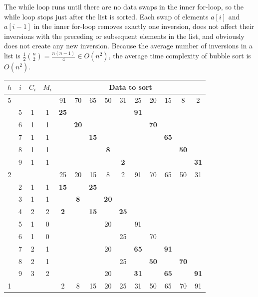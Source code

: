 {}%
The while loop runs until there are no data swaps in the inner for-loop, so the while loop 
stops just after the list is sorted. Each swap of elements $a[i]$ and $a[i-1]$ in the inner for-loop 
removes exactly one inversion, does not affect their inversions with the preceding
or subsequent elements in the list, and obviously does not create any new inversion. Because the average
number of inversions in a list is $\frac{1}{2}\binom{n}{2} = \frac{n(n-1)}{4}\in O(n^2)$, the 
average time complexity of bubble sort is $O(n^2)$.

{}%
\begin{center}\footnotesize
\begin{tabular}{|c|c|c|c|c|c|c|c|c|c|c|c|c|c|}
\hline
\(h\)& \(i\)& \(C_i\)& \(M_i\) &\multicolumn{10}{|c|}{\textbf{Data to sort}} \\
\hline
5& \multicolumn{3}{|c|}{}& 91& 70& 65& 50& 31& 25& 20& 15& 8& 2 \\
\cline{2-14}
& 5& 1& 1& \textbf{25}& & & & & \textbf{91}& & & & \\
\cline{2-14}
& 6& 1& 1& & \textbf{20}& & & & & \textbf{70}& & & \\
\cline{2-14}
& 7& 1& 1& & & \textbf{15}& & & & & \textbf{65}& & \\
\cline{2-14}
& 8& 1& 1& & & & \textbf{8}& & & & & \textbf{50}& \\
\cline{2-14}
& 9& 1& 1& & & & & \textbf{2}& & & & & \textbf{31} \\
\hline
2& \multicolumn{3}{|c|}{}& 25& 20& 15& 8& 2& 91& 70& 65& 50& 31 \\
\cline{2-14}
& 2& 1& 1& \textbf{15}& & \textbf{25}& & & & & & & \\
\cline{2-14}
& 3& 1& 1& & \textbf{8}& & \textbf{20}& & & & & & \\
\cline{2-14}
& 4& 2& 2& \textbf{2}& & \textbf{15}& & \textbf{25}& & & & & \\
\cline{2-14}
& 5& 1& 0& & & & 20& & 91& & & & \\
\cline{2-14}
& 6& 1& 0& & & & & 25& & 70& & & \\
\cline{2-14}
& 7& 2& 1& & & & 20& & \textbf{65}& & \textbf{91}& & \\
\cline{2-14}
& 8& 2& 1& & & & & 25& & \textbf{50}& & \textbf{70}& \\
\cline{2-14}
& 9& 3& 2& & & & 20& & \textbf{31}& & \textbf{65}& & \textbf{91} \\
\hline
1& \multicolumn{3}{|c|}{}& 2& 8& 15& 20& 25& 31& 50& 65& 70& 91 \\

\end{tabular}
\end{center}
